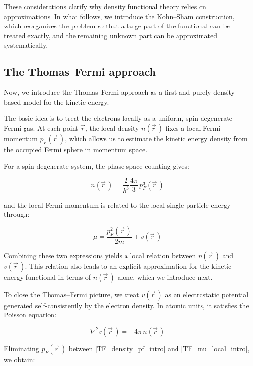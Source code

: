 These considerations clarify why density functional theory relies on approximations.
In what follows, we introduce the Kohn--Sham construction,
which reorganizes the problem so that a large part of the functional can be treated exactly,
and the remaining unknown part can be approximated systematically.

\subsection{The Thomas--Fermi approach}

Now, we introduce the Thomas--Fermi approach as a first and purely density-based model for the kinetic energy.

The basic idea is to treat the electrons locally as a uniform, spin-degenerate Fermi gas.
At each point $\vec{r}$, the local density $n(\vec{r}\,)$ fixes a local Fermi momentum $p_F(\vec{r}\,)$, which allows us to estimate the kinetic energy density from the occupied Fermi sphere in momentum space.

For a spin-degenerate system, the phase-space counting gives:

\begin{equation}
    n(\vec{r}\,) = \frac{2}{h^3}\frac{4\pi}{3}\,p_F^3(\vec{r}\,)
\label{TF_density_pf_intro}
\end{equation}

and the local Fermi momentum is related to the local single-particle energy through:

\begin{equation}
    \mu = \frac{p_F^2(\vec{r}\,)}{2m}+v(\vec{r}\,)
\label{TF_mu_local_intro}
\end{equation}

Combining these two expressions yields a local relation between $n(\vec{r}\,)$ and $v(\vec{r}\,)$.
This relation also leads to an explicit approximation for the kinetic energy functional in terms of $n(\vec{r}\,)$ alone, which we introduce next.

To close the Thomas--Fermi picture, we treat $v(\vec{r}\,)$ as an electrostatic potential generated self-consistently by the electron density.
In atomic units, it satisfies the Poisson equation:

\begin{equation}
    \nabla^2 v(\vec{r}\,) = -4\pi\,n(\vec{r}\,)
\label{TF_poisson_equation}
\end{equation}

Eliminating $p_F(\vec{r}\,)$ between \eqref{TF_density_pf_intro} and \eqref{TF_mu_local_intro}, we obtain:

